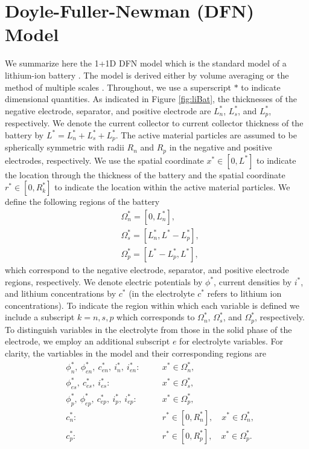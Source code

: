 \documentclass[preprint]{elsarticle}
\begin{document}
\section{Doyle-Fuller-Newman (DFN) Model}
We summarize here the 1+1D DFN model which is the standard model of a lithium-ion battery \cite{doyle,Fuller1994,newman_book}. The model is derived either by volume averaging \cite{newman_book} or the method of multiple scales \cite{Richardson2011}. Throughout, we use a superscript $*$ to indicate dimensional quantities. As indicated in Figure \ref{fig:liBat}, the thicknesses of the negative electrode, separator, and positive electrode are $L^*_n$, $L_s^*$, and $L_p^*$, respectively. We denote the current collector to current collector thickness of the battery by $L^*=L_n^*+L_s^*+L_p^*$. The active material particles are assumed to be spherically symmetric with radii $R_n$ and $R_p$ in the negative and positive electrodes, respectively. We use the spatial coordinate $x^*\in[0,L^*]$ to indicate the location through the thickness of the battery and the spatial coordinate $r^*\in[0,R_k^*]$ to indicate the location within the active material particles. We define the following regions of the battery
\begin{align*}
    &\Omega^*_n = [0, L_n^*], \\ 
    &\Omega^*_s = [L_n^*, L^*-L_p^*], \\ 
    &\Omega^*_p = [L^*-L_p^*, L^*],
\end{align*}
which correspond to the negative electrode, separator, and positive electrode regions, respectively. We denote electric potentials by $\phi^*$, current densities by $i^*$, and lithium concentrations by $c^*$ (in the electrolyte $c^*$ refers to lithium ion concentrations). To indicate the region within which each variable is defined we include a subscript $k=n,s,p$ which corresponds to $\Omega^*_n$, $\Omega^*_s$, and $\Omega^*_p$, respectively. To distinguish variables in the electrolyte from those in the solid phase of the electrode, we employ an additional subscript $e$ for electrolyte variables. For clarity, the vartiables in the model and their corresponding regions are
\begin{align*}
 & \phi_n^*, \ 
 \phi_{en}^*, \
  c_{en}^*, \
 i_n^*, \
 i_{en}^*: \quad
 &&x^*\in \Omega_{n}^*, \\
 & \phi_{es}^*, \
  c_{es}^*, \
 i_{es}^*: \quad
 &&x^*\in \Omega_{s}^*, 
 \\
  & \phi_p^*, \ 
 \phi_{ep}^*, \
  c_{ep}^*, \
 i_p^*, \
 i_{ep}^*: \quad
 &&x^*\in \Omega_{p}^*, 
 \\
 &c_n^*: &&r^*\in[0,R_n^*],  \quad x^*\in \Omega_{n}^*, 
 \\
 &c_p^*: &&r^*\in[0,R_p^*], \quad x^*\in \Omega_{p}^*.
\end{align*}
\end{document}
